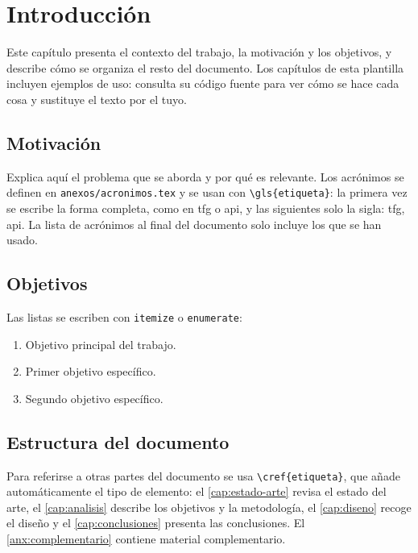 
\chapter{Introducción}
\label{cap:introduccion}

Este capítulo presenta el contexto del trabajo, la motivación y los objetivos, y describe cómo se organiza el resto del documento. Los capítulos de esta plantilla incluyen ejemplos de uso: consulta su código fuente para ver cómo se hace cada cosa y sustituye el texto por el tuyo.

\section{Motivación}

Explica aquí el problema que se aborda y por qué es relevante. Los acrónimos se definen en \texttt{anexos/acronimos.tex} y se usan con \verb|\gls{etiqueta}|: la primera vez se escribe la forma completa, como en \gls{tfg} o \gls{api}, y las siguientes solo la sigla: \gls{tfg}, \gls{api}. La lista de acrónimos al final del documento solo incluye los que se han usado.

\section{Objetivos}

Las listas se escriben con \texttt{itemize} o \texttt{enumerate}:

\begin{enumerate}
  \item Objetivo principal del trabajo.
  \item Primer objetivo específico.
  \item Segundo objetivo específico.
\end{enumerate}

\section{Estructura del documento}

Para referirse a otras partes del documento se usa \verb|\cref{etiqueta}|, que añade automáticamente el tipo de elemento: el \cref{cap:estado-arte} revisa el estado del arte, el \cref{cap:analisis} describe los objetivos y la metodología, el \cref{cap:diseno} recoge el diseño y el \cref{cap:conclusiones} presenta las conclusiones. El \cref{anx:complementario} contiene material complementario.

